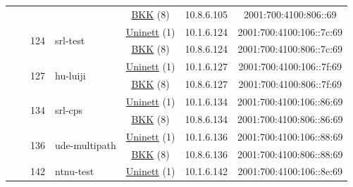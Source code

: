 \begin{small}
\begin{center}
\begin{longtable}{|c|c|c|c|c|c|c|c|}
  &  & \multicolumn{2}{|c|}{} & \multicolumn{2}{|c|}{\tiny{\href{http://bkk.no}{BKK} (8)}} & \tiny{10.8.6.105} & \tiny{2001:700:4100:806::69} \\* \cline{3-3}\cline{4-4}\cline{5-5}\cline{6-6}\cline{7-7}\cline{8-8}
  &  & \multirow{2}{*}{\tiny{124}} & \multicolumn{1}{|l|}{\multirow{2}{*}{\tiny{srl-test}}} & \multicolumn{2}{|c|}{\tiny{\href{https://www.uninett.no}{Uninett} (1)}} & \tiny{10.1.6.124} & \tiny{2001:700:4100:106::7c:69} \\* \cline{5-5}\cline{6-6}\cline{7-7}\cline{8-8}
  &  &  &  & \multicolumn{2}{|c|}{\tiny{\href{http://bkk.no}{BKK} (8)}} & \tiny{10.8.6.124} & \tiny{2001:700:4100:806::7c:69} \\* \cline{3-3}\cline{4-4}\cline{5-5}\cline{6-6}\cline{7-7}\cline{8-8}
  &  & \multirow{2}{*}{\tiny{127}} & \multicolumn{1}{|l|}{\multirow{2}{*}{\tiny{hu-luiji}}} & \multicolumn{2}{|c|}{\tiny{\href{https://www.uninett.no}{Uninett} (1)}} & \tiny{10.1.6.127} & \tiny{2001:700:4100:106::7f:69} \\* \cline{5-5}\cline{6-6}\cline{7-7}\cline{8-8}
  &  &  &  & \multicolumn{2}{|c|}{\tiny{\href{http://bkk.no}{BKK} (8)}} & \tiny{10.8.6.127} & \tiny{2001:700:4100:806::7f:69} \\* \cline{3-3}\cline{4-4}\cline{5-5}\cline{6-6}\cline{7-7}\cline{8-8}
  &  & \multirow{2}{*}{\tiny{134}} & \multicolumn{1}{|l|}{\multirow{2}{*}{\tiny{srl-cps}}} & \multicolumn{2}{|c|}{\tiny{\href{https://www.uninett.no}{Uninett} (1)}} & \tiny{10.1.6.134} & \tiny{2001:700:4100:106::86:69} \\* \cline{5-5}\cline{6-6}\cline{7-7}\cline{8-8}
  &  &  &  & \multicolumn{2}{|c|}{\tiny{\href{http://bkk.no}{BKK} (8)}} & \tiny{10.8.6.134} & \tiny{2001:700:4100:806::86:69} \\* \cline{3-3}\cline{4-4}\cline{5-5}\cline{6-6}\cline{7-7}\cline{8-8}
  &  & \multirow{2}{*}{\tiny{136}} & \multicolumn{1}{|l|}{\multirow{2}{*}{\tiny{ude-multipath}}} & \multicolumn{2}{|c|}{\tiny{\href{https://www.uninett.no}{Uninett} (1)}} & \tiny{10.1.6.136} & \tiny{2001:700:4100:106::88:69} \\* \cline{5-5}\cline{6-6}\cline{7-7}\cline{8-8}
  &  &  &  & \multicolumn{2}{|c|}{\tiny{\href{http://bkk.no}{BKK} (8)}} & \tiny{10.8.6.136} & \tiny{2001:700:4100:806::88:69} \\* \cline{3-3}\cline{4-4}\cline{5-5}\cline{6-6}\cline{7-7}\cline{8-8}
  &  & \multirow{2}{*}{\tiny{142}} & \multicolumn{1}{|l|}{\multirow{2}{*}{\tiny{ntnu-test}}} & \multicolumn{2}{|c|}{\tiny{\href{https://www.uninett.no}{Uninett} (1)}} & \tiny{10.1.6.142} & \tiny{2001:700:4100:106::8e:69} \\* \cline{5-5}\cline{6-6}\cline{7-7}\cline{8-8}

\end{longtable}
\end{center}
\end{small}

